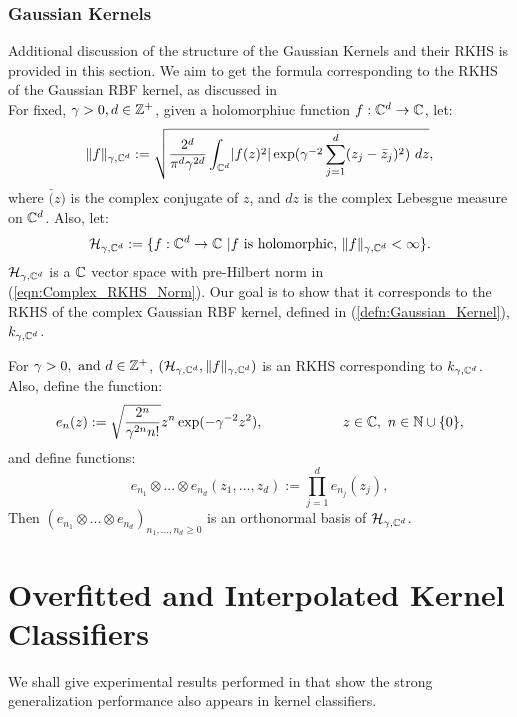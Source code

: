 \documentclass[twoside]{memoir}
\begin{document}
\subsection{Gaussian Kernels}
Additional discussion of the structure of the Gaussian Kernels and their RKHS is provided in this section. We aim to get the formula corresponding to the RKHS of the Gaussian RBF kernel, as discussed in \cite{steinwartSVM}\\

For fixed, $\gamma > 0, d \in \mathbb{Z}^+$, given a holomorphiuc function $f: \mathbb{C}^d \rightarrow \mathbb{C}$, let:
\begin{equation} \label{eqn:Complex_RKHS_Norm}
\lVert f\rVert_{\gamma, \mathbb{C}^d} := \sqrt{\frac{2^d}{\pi^d\gamma^{2d}} \int_{\mathbb{C}^d} \lvert f(z)^2\rvert\exp(\gamma^{-2}\sum_{j=1}^{d}(z_j - \bar{z}_j)^2)~dz},
\end{equation}
where $\bar(z)$ is the complex conjugate of $z$, and $dz$ is the complex Lebesgue measure on $\mathbb{C}^d$. Also, let:
\begin{equation} \label{eqn:Complex_RKHS_Struct}
\mathcal{H}_{\gamma, \mathbb{C}^d} := \{ f: \mathbb{C}^d \rightarrow \mathbb{C} ~ | f \text{ is holomorphic, } \lVert f\rVert_{\gamma, \mathbb{C}^d} < \infty \}.
\end{equation}
$\mathcal{H}_{\gamma, \mathbb{C}^d} $ is a $\mathbb{C}$ vector space with pre-Hilbert norm in (\ref{eqn:Complex_RKHS_Norm}). Our goal is to show that it corresponds to the RKHS of the complex Gaussian RBF kernel, defined in (\ref{defn:Gaussian_Kernel}), $k_{\gamma, \mathbb{C}^d}$.
\begin{thm}
	For $\gamma > 0, \text{ and } d \in \mathbb{Z}^+$, $(\mathcal{H}_{\gamma, \mathbb{C}^d}, \lVert f\rVert_{\gamma, \mathbb{C}^d})$ is an RKHS corresponding to $k_{\gamma, \mathbb{C}^d}$. Also, define the function:
	\begin{equation}
	e_n(z) := \sqrt{\frac{2^n}{\gamma^{2n}n!}}z^n \exp(-\gamma^{-2} z^2), \hspace{2cm} z \in \mathbb{C}, ~ n \in \mathbb{N} \cup \{0\},
	\end{equation}
	and define functions:
	\begin{equation}
	e_{n_1} \otimes ... \otimes e_{n_d} (z_1,...,z_d):= \prod_{j=1}^{d} e_{n_j} (z_j) ,
	\end{equation}
	Then $(e_{n_1} \otimes ... \otimes e_{n_d})_{n_1,...,n_d \geq 0}$ is an orthonormal basis of $\mathcal{H}_{\gamma, \mathbb{C}^d}$.
\end{thm}
\chapter{Overfitted and Interpolated Kernel Classifiers}
We shall give experimental results performed in \cite{UnderstandKernel} that show the strong generalization performance also appears in kernel classifiers.
\end{document}
